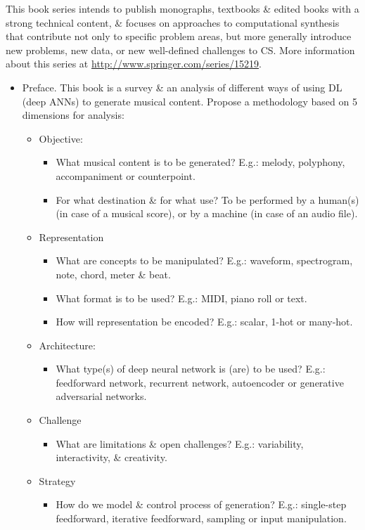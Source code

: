 \documentclass{article}
\begin{document}
This book series intends to publish monographs, textbooks \& edited books with a strong technical content, \& focuses on approaches to computational synthesis that contribute not only to specific problem areas, but more generally introduce new problems, new data, or new well-defined challenges to CS. More information about this series at \url{http://www.springer.com/series/15219}.
\begin{itemize}
	\item {\sf Preface.} This book is a survey \& an analysis of different ways of using DL (deep ANNs) to generate musical content. Propose a methodology based on 5 dimensions for analysis:
	\begin{itemize}
		\item Objective:
		\begin{itemize}
			\item What musical content is to be generated? E.g.: melody, polyphony, accompaniment or counterpoint.
			\item For what destination \& for what use? To be performed by a human(s) (in case of a musical score), or by a machine (in case of an audio file).
		\end{itemize}
		\item Representation
		\begin{itemize}
			\item What are concepts to be manipulated? E.g.: waveform, spectrogram, note, chord, meter \& beat.
			\item What format is to be used? E.g.: MIDI, piano roll or text.
			\item How will representation be encoded? E.g.: scalar, 1-hot or many-hot.
		\end{itemize}
		\item Architecture:
		\begin{itemize}
			\item What type(s) of deep neural network is (are) to be used? E.g.: feedforward network, recurrent network, autoencoder or generative adversarial networks.
		\end{itemize}
		\item Challenge
		\begin{itemize}
			\item What are limitations \& open challenges? E.g.: variability, interactivity, \& creativity.
		\end{itemize}
		\item Strategy
		\begin{itemize}
			\item How do we model \& control process of generation? E.g.: single-step feedforward, iterative feedforward, sampling or input manipulation.

\end{itemize}
\end{itemize}
\end{itemize}
\end{document}
